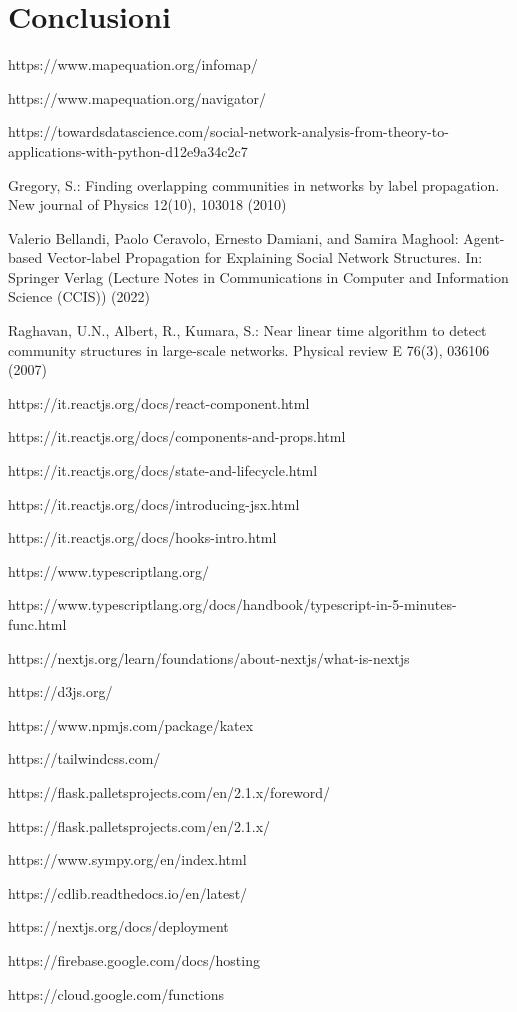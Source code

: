 \documentclass[a4paper,12pt]{report}
\begin{document}
\chapter{Conclusioni}

%
%
\begin{thebibliography}{0}
%
https://www.mapequation.org/infomap/

https://www.mapequation.org/navigator/

https://towardsdatascience.com/social-network-analysis-from-theory-to-applications-with-python-d12e9a34c2c7

Gregory, S.: Finding overlapping communities in networks by label propagation.
New journal of Physics 12(10), 103018 (2010)

Valerio Bellandi, Paolo Ceravolo, Ernesto Damiani, and Samira Maghool: Agent-based Vector-label Propagation for Explaining Social Network Structures. In: Springer Verlag (Lecture Notes in Communications in Computer and Information Science (CCIS)) (2022)

Raghavan, U.N., Albert, R., Kumara, S.: Near linear time algorithm to detect
community structures in large-scale networks. Physical review E 76(3), 036106
(2007)

https://it.reactjs.org/docs/react-component.html

https://it.reactjs.org/docs/components-and-props.html

https://it.reactjs.org/docs/state-and-lifecycle.html

https://it.reactjs.org/docs/introducing-jsx.html

https://it.reactjs.org/docs/hooks-intro.html

https://www.typescriptlang.org/

https://www.typescriptlang.org/docs/handbook/typescript-in-5-minutes-func.html

https://nextjs.org/learn/foundations/about-nextjs/what-is-nextjs

https://d3js.org/

https://www.npmjs.com/package/katex

https://tailwindcss.com/

https://flask.palletsprojects.com/en/2.1.x/foreword/

https://flask.palletsprojects.com/en/2.1.x/

https://www.sympy.org/en/index.html

https://cdlib.readthedocs.io/en/latest/

https://nextjs.org/docs/deployment

https://firebase.google.com/docs/hosting

https://cloud.google.com/functions
%
\end{thebibliography}
% 
\end{document}
